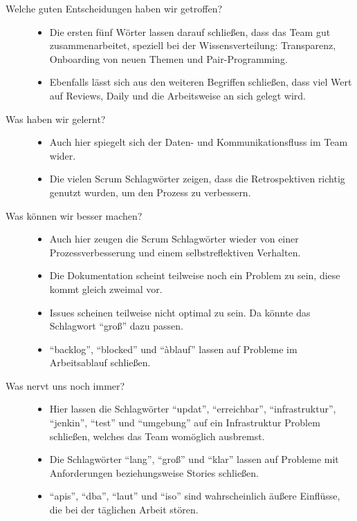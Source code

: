 \begin{description}
    \item[Welche guten Entscheidungen haben wir getroffen?] \hfill
    \begin{itemize}[noitemsep]
      \item Die ersten fünf Wörter lassen darauf schließen, dass das Team gut zusammenarbeitet, speziell bei der Wissensverteilung: Transparenz, Onboarding von neuen Themen und Pair-Programming.
      \item Ebenfalls lässt sich aus den weiteren Begriffen schließen, dass viel Wert auf Reviews, Daily und die Arbeitsweise an sich gelegt wird.
    \end{itemize}
    \item[Was haben wir gelernt?] \hfill
    \begin{itemize}[noitemsep]
      \item Auch hier spiegelt sich der Daten- und Kommunikationsfluss im Team wider.
      \item Die vielen Scrum Schlagwörter zeigen, dass die Retrospektiven richtig genutzt wurden, um den Prozess zu verbessern.
    \end{itemize}
    \item[Was können wir besser machen?] \hfill
    \begin{itemize}[noitemsep]
      \item Auch hier zeugen die Scrum Schlagwörter wieder von einer Prozessverbesserung und einem selbstreflektiven Verhalten.
      \item Die Dokumentation scheint teilweise noch ein Problem zu sein, diese kommt gleich zweimal vor.
      \item Issues scheinen teilweise nicht optimal zu sein. Da könnte das Schlagwort ``groß'' dazu passen.
      \item ``backlog'', ``blocked'' und ``àblauf'' lassen auf Probleme im Arbeitsablauf schließen.
    \end{itemize}
    \item[Was nervt uns noch immer?] \hfill
    \begin{itemize}[noitemsep]
      \item Hier lassen die Schlagwörter ``updat'', ``erreichbar'', ``infrastruktur'', ``jenkin'', ``test'' und ``umgebung'' auf ein Infrastruktur Problem schließen, welches das Team womöglich ausbremst.
      \item Die Schlagwörter ``lang'', ``groß'' und ``klar'' lassen auf Probleme mit Anforderungen beziehungsweise Stories schließen.
      \item ``apis'', ``dba'', ``laut'' und ``iso'' sind wahrscheinlich äußere Einflüsse, die bei der täglichen Arbeit stören.
    \end{itemize}
  \end{description}

